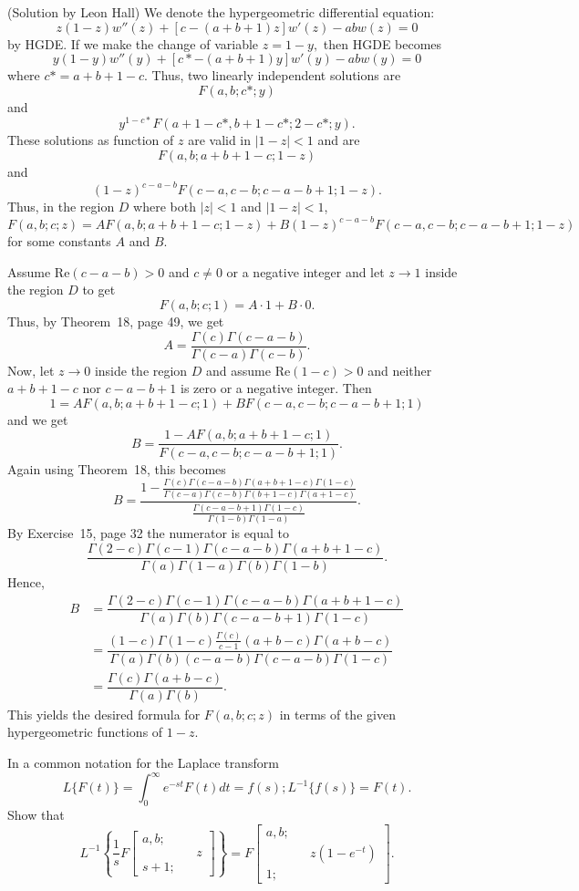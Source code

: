 \begin{solution}(Solution by Leon Hall)
We denote the hypergeometric differential equation:
$$z(1-z)w''(z)+[c-(a+b+1)z]w'(z)-abw(z)=0$$
by HGDE. If we make the change of variable $z = 1-y,$ then HGDE becomes
$$y(1-y)w''(y)+[c*-(a+b+1)y]w'(y)-abw(y)=0$$
where $c*=a+b+1-c$. Thus, two linearly independent solutions are
$$F(a,b;c*;y)$$
and
$$y^{1-c*}F(a+1-c*,b+1-c*;2-c*;y).$$
These solutions as function of $z$ are valid in $|1-z|<1$ and are
$$F(a,b;a+b+1-c;1-z)$$
and
$$(1-z)^{c-a-b}F(c-a,c-b;c-a-b+1;1-z).$$
Thus, in the region $D$ where both $|z|<1$ and $|1-z|<1$, 
$$F(a,b;c;z)=AF(a,b;a+b+1-c;1-z) + B(1-z)^{c-a-b}F(c-a,c-b;c-a-b+1;1-z)$$
for some constants $A$ and $B$.

Assume $\mathrm{Re}(c-a-b)>0$ and $c \neq 0$ or a negative integer and let $z \rightarrow 1$ inside the region $D$ to get
$$F(a,b;c;1)=A \cdot 1 + B \cdot 0.$$
Thus, by Theorem~18, page 49, we get
$$A = \dfrac{\Gamma(c) \Gamma(c-a-b)}{\Gamma(c-a) \Gamma(c-b)}.$$
Now, let $z \rightarrow 0$ inside the region $D$ and assume $\mathrm{Re}(1-c)>0$ and neither $a+b+1-c$ nor $c-a-b+1$ is zero or a negative integer. Then
$$1 = AF(a,b;a+b+1-c;1) + BF(c-a,c-b;c-a-b+1;1)$$
and we get
$$B = \dfrac{1 - AF(a,b;a+b+1-c;1)}{F(c-a,c-b;c-a-b+1;1)}.$$
Again using Theorem~18, this becomes
$$B = \dfrac{1 - \frac{\Gamma(c) \Gamma(c-a-b) \Gamma(a+b+1-c) \Gamma(1-c)}{\Gamma(c-a) \Gamma(c-b) \Gamma(b+1-c) \Gamma(a+1-c)}}{\frac{\Gamma(c-a-b+1) \Gamma(1-c)}{\Gamma(1-b) \Gamma(1-a)}}.$$
By Exercise~15, page 32 the numerator is equal to
$$\dfrac{\Gamma(2-c) \Gamma(c-1) \Gamma(c-a-b) \Gamma(a+b+1-c)}{\Gamma(a) \Gamma(1-a) \Gamma(b) \Gamma(1-b)}.$$
Hence,
$$\begin{array}{ll}
B &= \dfrac{\Gamma(2-c) \Gamma(c-1) \Gamma(c-a-b) \Gamma(a+b+1-c)}{\Gamma(a)\Gamma(b) \Gamma(c-a-b+1) \Gamma(1-c)} \\
&= \dfrac{(1-c) \Gamma(1-c) \frac{\Gamma(c)}{c-1} (a+b-c) \Gamma(a+b-c)}{\Gamma(a) \Gamma(b) (c-a-b) \Gamma(c-a-b) \Gamma(1-c)} \\
&= \dfrac{\Gamma(c) \Gamma(a+b-c)}{\Gamma(a) \Gamma(b)}.
\end{array}$$
This yields the desired formula for $F(a,b;c;z)$ in terms of the given hypergeometric functions of $1-z$.
\end{solution}
\begin{problem}\label{problem16chapter4}
In a common notation for the Laplace transform
$$L \{F(t)\} = \displaystyle\int_0^{\infty} e^{-st} F(t) dt = f(s); L^{-1}\{f(s)\} = F(t).$$
Show that 
$$L^{-1} \left\{ \dfrac{1}{s} F \left[ \begin{array}{rlr}
a,b; & & \\
& & z \\
s+1; & & 
\end{array} \right] \right\} = F \left[ \begin{array}{rlr}
a, b; & & \\
& & z(1-e^{-t}) \\
1; & & 
\end{array} \right].$$
\end{problem}
